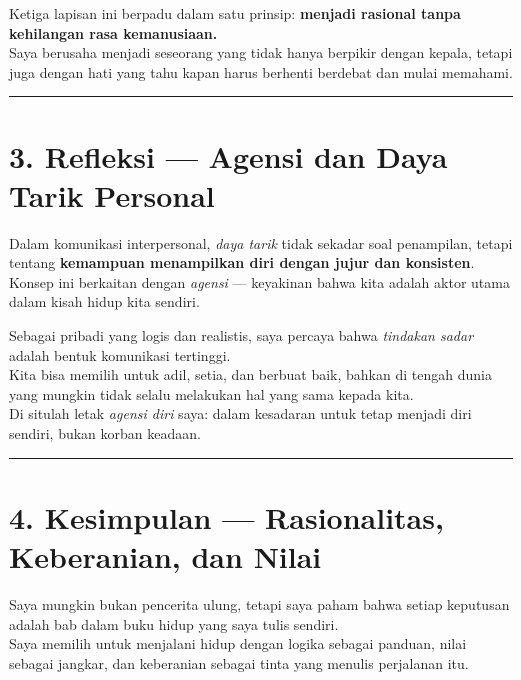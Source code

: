 \documentclass[
  letterpaper,
  DIV=11,
  numbers=noendperiod]{scrreprt}
\begin{document}
Ketiga lapisan ini berpadu dalam satu prinsip: \textbf{menjadi rasional
tanpa kehilangan rasa kemanusiaan.}\\
Saya berusaha menjadi seseorang yang tidak hanya berpikir dengan kepala,
tetapi juga dengan hati yang tahu kapan harus berhenti berdebat dan
mulai memahami.

\begin{center}\rule{0.5\linewidth}{0.5pt}\end{center}

\section{\texorpdfstring{\textbf{3. Refleksi --- Agensi dan Daya Tarik
Personal}}{3. Refleksi --- Agensi dan Daya Tarik Personal}}\label{refleksi-agensi-dan-daya-tarik-personal}

Dalam komunikasi interpersonal, \emph{daya tarik} tidak sekadar soal
penampilan, tetapi tentang \textbf{kemampuan menampilkan diri dengan
jujur dan konsisten}.\\
Konsep ini berkaitan dengan \emph{agensi} --- keyakinan bahwa kita
adalah aktor utama dalam kisah hidup kita sendiri.

Sebagai pribadi yang logis dan realistis, saya percaya bahwa
\emph{tindakan sadar} adalah bentuk komunikasi tertinggi.\\
Kita bisa memilih untuk adil, setia, dan berbuat baik, bahkan di tengah
dunia yang mungkin tidak selalu melakukan hal yang sama kepada kita.\\
Di situlah letak \emph{agensi diri} saya: dalam kesadaran untuk tetap
menjadi diri sendiri, bukan korban keadaan.

\begin{center}\rule{0.5\linewidth}{0.5pt}\end{center}

\section{\texorpdfstring{\textbf{4. Kesimpulan --- Rasionalitas,
Keberanian, dan
Nilai}}{4. Kesimpulan --- Rasionalitas, Keberanian, dan Nilai}}\label{kesimpulan-rasionalitas-keberanian-dan-nilai}

Saya mungkin bukan pencerita ulung, tetapi saya paham bahwa setiap
keputusan adalah bab dalam buku hidup yang saya tulis sendiri.\\
Saya memilih untuk menjalani hidup dengan logika sebagai panduan, nilai
sebagai jangkar, dan keberanian sebagai tinta yang menulis perjalanan
itu.
\end{document}
